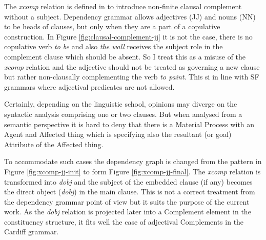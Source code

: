     The \textit{xcomp} relation is defined in \citet{Marneffe2008} to introduce non-finite clausal complement without a subject. Dependency grammar allows adjectives (JJ) and nouns (NN) to be heads of clauses, but only when they are a part of a copulative construction. In Figure \ref{fig:clausal-complement-jj} it is not the case, there is no copulative verb \textit{to be} and also \textit{the wall} receives the subject role in the complement clause which should be absent. So I treat this as a misuse of the \textit{xcomp} relation and the adjective should not be treated as governing a new clause but rather non-clausally complementing the verb \textit{to paint}. This si in line with SF grammars where adjectival predicates are not allowed.

    Certainly, depending on the linguistic school, opinions may diverge on the syntactic analysis comprising one or two clauses. But when analysed from a semantic perspective it is hard to deny that there is a Material Process with an Agent and Affected thing which is specifying also the resultant (or goal) Attribute of the Affected thing. 

    To accommodate such cases the dependency graph is changed from the pattern in Figure \ref{fig:xcomp-jj-init} to form Figure \ref{fig:xcomp-jj-final}. The \textit{xcomp} relation is transformed into \textit{dobj} and the subject of the embedded clause (if any) becomes the direct object (\textit{dobj}) in the main clause. This is not a correct treatment from the dependency grammar point of view but it suits the purpose of the current work. As the \textit{dobj} relation is projected later into a Complement element in the constituency structure, it fits well the case of adjectival Complements in the Cardiff grammar.

